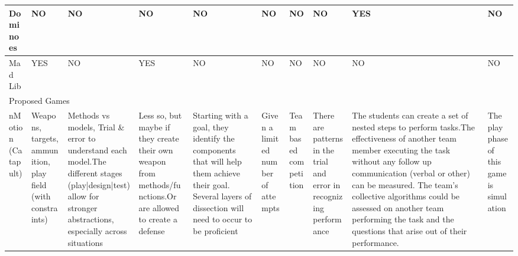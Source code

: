 \documentclass{acm_proc_article-sp}
\begin{document}
\begin{sidewaystable}[htbp]
\begin{tabular}{|p{1.5cm}||p{1.5cm}|p{2.5cm}|p{2.5cm}|p{2.7cm}|p{2cm}|p{1.5cm}|p{2cm}|p{3.5cm}|p{1.5cm}|}
    Dominoes 
      & NO 
      & NO 
      & NO 
      & NO 
      & NO 
      & NO 
      & NO 
      & \cellcolor{blue!25}YES 
      & NO \\ \hline

    Mad Lib 
      & \cellcolor{blue!25}YES 
      & NO 
      & \cellcolor{blue!25}YES 
      & NO 
      & NO 
      & NO 
      & NO 
      & NO 
      & NO \\ \hline \hline    

    \multicolumn{10}{|l|}{Proposed Games} \\ \hline \hline

    nMotion (Catapult)
      & \raggedright{Weapons, targets, ammunition, play field (with constraints)} 
      & \raggedright{Methods vs models, Trial \& error to understand each model.\newline \newline The different stages (play|design|test) allow for stronger abstractions, especially across situations} 
      & \raggedright{Less so, but maybe if they create their own weapon from methods/functions.\newline \newline Or are allowed to create a defense} 
      & \raggedright{Starting with a goal, they identify the components that will help them achieve their goal.
        Several layers of dissection will need to occur to be proficient} 
      & \raggedright{Given a limited number of attempts}     
      & \raggedright{Team based competition} 
      & \raggedright{There are patterns in the trial and error in recognizing performance} 
      & \raggedright{The students can create a set of nested steps to perform tasks.\newline \newline The effectiveness of another team member executing the task without any follow up communication (verbal or other) can be measured.
        The team's collective algorithms could be assessed on another team performing the task and the questions that arise out of their performance.} 
      & {\raggedright The play phase of this game is simulation} \\ \hline
    

\end{tabular}
\end{sidewaystable}
\end{document}
